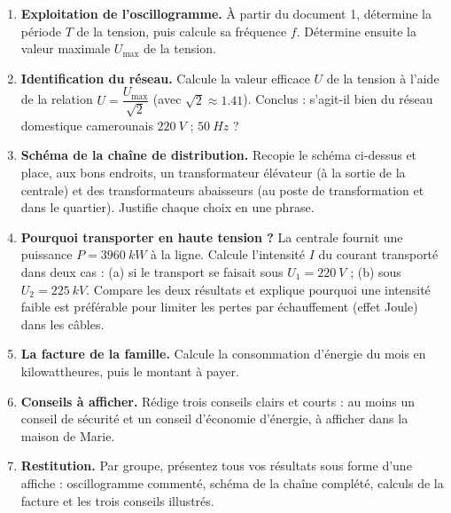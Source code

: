 \documentclass[11pt]{article}
\newcommand{\cle}[1]{{\popxbold\color{popdark}#1}}
\newcounter{popsec}
\newcounter{popsub}
\newcommand{\courssub}[1]{%
  \stepcounter{popsub}%
  \par\vspace{9pt}\noindent{\popxbold\fontsize{11.5}{13}\selectfont\color{popink}{\color{poporange}\thepopsec.\thepopsub}\hspace{6pt}#1}\par\nopagebreak\vspace{4pt}
}
\begin{document}
\begin{enumerate}
\item \textbf{Exploitation de l'oscillogramme.} À partir du document 1, détermine la période $T$ de la tension, puis calcule sa fréquence $f$. Détermine ensuite la valeur maximale $U_{\max}$ de la tension.
\item \textbf{Identification du réseau.} Calcule la valeur efficace $U$ de la tension à l'aide de la relation $U = \dfrac{U_{\max}}{\sqrt{2}}$ (avec $\sqrt{2} \approx \num{1,41}$). Conclus : s'agit-il bien du réseau domestique camerounais $\SI{220}{V}$ ; $\SI{50}{Hz}$ ?
\item \textbf{Schéma de la chaîne de distribution.} Recopie le schéma ci-dessus et place, aux bons endroits, un transformateur \cle{élévateur} (à la sortie de la centrale) et des transformateurs \cle{abaisseurs} (au poste de transformation et dans le quartier). Justifie chaque choix en une phrase.
\item \textbf{Pourquoi transporter en haute tension ?} La centrale fournit une puissance $P = \SI{3960}{kW}$ à la ligne. Calcule l'intensité $I$ du courant transporté dans deux cas : (a) si le transport se faisait sous $U_1 = \SI{220}{V}$ ; (b) sous $U_2 = \SI{225}{kV}$. Compare les deux résultats et explique pourquoi une intensité faible est préférable pour limiter les pertes par échauffement (effet Joule) dans les câbles.
\item \textbf{La facture de la famille.} Calcule la consommation d'énergie du mois en kilowattheures, puis le montant à payer.
\item \textbf{Conseils à afficher.} Rédige trois conseils clairs et courts : au moins un conseil de \cle{sécurité} et un conseil d'\cle{économie d'énergie}, à afficher dans la maison de Marie.
\item \textbf{Restitution.} Par groupe, présentez tous vos résultats sous forme d'une affiche : oscillogramme commenté, schéma de la chaîne complété, calculs de la facture et les trois conseils illustrés.
\end{enumerate}

\courssub{Ressources à mobiliser}
\end{document}
